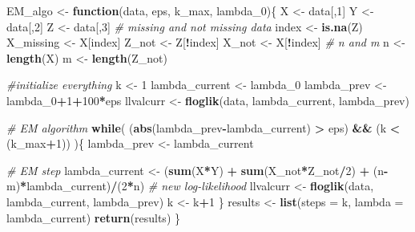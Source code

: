 \documentclass[
]{article}
\newenvironment{Shaded}{\begin{snugshade}}{\end{snugshade}}
\newcommand{\CommentTok}[1]{\textcolor[rgb]{0.56,0.35,0.01}{\textit{#1}}}
\newcommand{\ControlFlowTok}[1]{\textcolor[rgb]{0.13,0.29,0.53}{\textbf{#1}}}
\newcommand{\DataTypeTok}[1]{\textcolor[rgb]{0.13,0.29,0.53}{#1}}
\newcommand{\DecValTok}[1]{\textcolor[rgb]{0.00,0.00,0.81}{#1}}
\newcommand{\KeywordTok}[1]{\textcolor[rgb]{0.13,0.29,0.53}{\textbf{#1}}}
\newcommand{\NormalTok}[1]{#1}
\newcommand{\OperatorTok}[1]{\textcolor[rgb]{0.81,0.36,0.00}{\textbf{#1}}}
\newcommand{\StringTok}[1]{\textcolor[rgb]{0.31,0.60,0.02}{#1}}
\begin{document}
\begin{Shaded}
\begin{Highlighting}[]
\NormalTok{EM_algo <-}\StringTok{ }\ControlFlowTok{function}\NormalTok{(data, eps, k_max, lambda_}\DecValTok{0}\NormalTok{)\{}
\NormalTok{  X <-}\StringTok{ }\NormalTok{data[,}\DecValTok{1}\NormalTok{]}
\NormalTok{  Y <-}\StringTok{ }\NormalTok{data[,}\DecValTok{2}\NormalTok{]}
\NormalTok{  Z <-}\StringTok{ }\NormalTok{data[,}\DecValTok{3}\NormalTok{]}
  \CommentTok{# missing and not missing data}
\NormalTok{  index <-}\StringTok{ }\KeywordTok{is.na}\NormalTok{(Z)}
\NormalTok{  X_missing <-}\StringTok{ }\NormalTok{X[index]}
\NormalTok{  Z_not <-}\StringTok{ }\NormalTok{Z[}\OperatorTok{!}\NormalTok{index]}
\NormalTok{  X_not <-}\StringTok{ }\NormalTok{X[}\OperatorTok{!}\NormalTok{index]}
  \CommentTok{# n and m}
\NormalTok{  n <-}\StringTok{ }\KeywordTok{length}\NormalTok{(X)}
\NormalTok{  m <-}\StringTok{ }\KeywordTok{length}\NormalTok{(Z_not)}
  
  \CommentTok{#initialize everything}
\NormalTok{  k <-}\StringTok{ }\DecValTok{1}
\NormalTok{  lambda_current <-}\StringTok{ }\NormalTok{lambda_}\DecValTok{0}
\NormalTok{  lambda_prev <-}\StringTok{ }\NormalTok{lambda_}\DecValTok{0}\OperatorTok{+}\DecValTok{1}\OperatorTok{+}\DecValTok{100}\OperatorTok{*}\NormalTok{eps}
\NormalTok{  llvalcurr <-}\StringTok{ }\KeywordTok{floglik}\NormalTok{(data, lambda_current, lambda_prev)}
  
  \CommentTok{# EM algorithm}
  \ControlFlowTok{while}\NormalTok{( (}\KeywordTok{abs}\NormalTok{(lambda_prev}\OperatorTok{-}\NormalTok{lambda_current) }\OperatorTok{>}\StringTok{ }\NormalTok{eps) }\OperatorTok{&&}\StringTok{  }\NormalTok{(k }\OperatorTok{<}\StringTok{ }\NormalTok{(k_max}\OperatorTok{+}\DecValTok{1}\NormalTok{)) )\{}
\NormalTok{    lambda_prev <-}\StringTok{ }\NormalTok{lambda_current}
    
    \CommentTok{# EM step}
\NormalTok{    lambda_current <-}\StringTok{ }\NormalTok{(}\KeywordTok{sum}\NormalTok{(X}\OperatorTok{*}\NormalTok{Y) }\OperatorTok{+}\StringTok{ }\KeywordTok{sum}\NormalTok{(X_not}\OperatorTok{*}\NormalTok{Z_not}\OperatorTok{/}\DecValTok{2}\NormalTok{) }\OperatorTok{+}\StringTok{ }\NormalTok{(n}\OperatorTok{-}\NormalTok{m)}\OperatorTok{*}\NormalTok{lambda_current)}\OperatorTok{/}\NormalTok{(}\DecValTok{2}\OperatorTok{*}\NormalTok{n)}
    \CommentTok{# new log-likelihood}
\NormalTok{    llvalcurr <-}\StringTok{ }\KeywordTok{floglik}\NormalTok{(data, lambda_current, lambda_prev)}
\NormalTok{    k <-}\StringTok{ }\NormalTok{k}\OperatorTok{+}\DecValTok{1}
\NormalTok{  \}}
\NormalTok{  results <-}\StringTok{ }\KeywordTok{list}\NormalTok{(}\DataTypeTok{steps =}\NormalTok{ k, }\DataTypeTok{lambda =}\NormalTok{ lambda_current)}
  \KeywordTok{return}\NormalTok{(results)}
\NormalTok{\}}


\end{Highlighting}
\end{Shaded}
\end{document}
